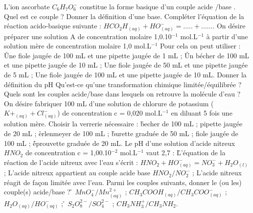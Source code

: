 \q
L'ion ascorbate $C_6H_7O_6^{-}$ constitue la forme basique d'un couple acide /base . 
Quel est ce couple ? 
\q
Donner la définition d'une base.
\q
Compléter l'équation de la réaction acido-basique suivante :
$HCO_2H_{(aq)}+ HO^{-}_{(aq)} =       …..     +  …….$
\q	
On désire préparer une solution A de concentration molaire 1,0.10$^{-1}$ mol.L$^{-1}$ à partir  d'une solution mère de concentration molaire 1,0 mol.L$^{-1}$  Pour cela on peut utiliser :
\r
Une fiole jaugée de 100 mL et une pipette jaugée de 1 mL ;
\r
Un bécher de 100 mL et une pipette jaugée de 10 mL ;
\rv
Une fiole jaugée de 50 mL et une pipette jaugée de 5 mL ;
\rv
Une fiole jaugée de 100 mL et une pipette jaugée de 10 mL.
\q	
 Donner la définition du pH
\q	
  Qu'est-ce qu'une transformation chimique limitée/équilibrée ?
\q	
  Quels sont les couples acide/base dans lesquels on retrouve la molécule d'eau   ?
\q	
 On désire fabriquer 100 mL d'une solution de chlorure de potassium ($K+_{(aq)} + Cl^{-}_{(aq)}$) de concentration   c = 0,020 mol.L$^{-1}$ en diluant 5 fois une solution mère. Choisir la verrerie nécessaire :
\r
  becher de 100 mL ;		
\rv
    pipette jaugée de 20 mL ;
\r
  erlenmeyer de 100 mL ;	
\r
  	  burette graduée de 50 mL ;
\rv
  fiole jaugée de 100 mL ; 
\r
              	  éprouvette graduée de 20 mL.
\q
   	Le pH d'une solution d'acide nitreux $HNO_2$ de concentration c = 1,00.10$^{-2}$ mol.L$^{-1}$ vaut 2,7 :
\r  
L'équation de la réaction de l'acide nitreux avec l'eau s'écrit : 
$HNO_2 + HO^{-}_{(aq)}  = NO_3^{-} + H_2O_(l)$ ;
\rv
  L'acide nitreux appartient au couple acide base $HNO_2/NO_2^-$ ;
\rv
  L'acide nitreux réagit de façon limitée avec l'eau.
\q	
   Parmi les couples suivants, donner le (ou les) couple(s) acide/base ?
\r
 	$MnO_4^- / Mn^{2+}_{(aq)}$ ;
\rv
 	$CH_3COOH_{(aq)} / CH_3COO^{-}_{(aq)}$ ;
\rv
 	$H_2O_{(aq)} / HO^{-}_{(aq)}$ ;
\r
 	$S_2O_8^{2-}/ SO_4^{2-}$ ;
\rv
 	$CH_3NH_3^+ / CH_3NH_2$.

